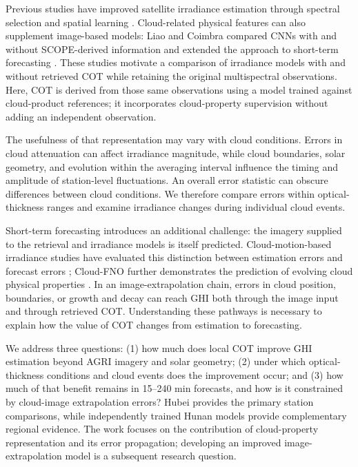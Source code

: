 \documentclass[11pt]{article}
\begin{document}
Previous studies have improved satellite irradiance estimation through spectral selection and spatial learning \cite{chen2023}. Cloud-related physical features can also supplement image-based models: Liao and Coimbra compared CNNs with and without SCOPE-derived information and extended the approach to short-term forecasting \cite{liao2024}. These studies motivate a comparison of irradiance models with and without retrieved COT while retaining the original multispectral observations. Here, COT is derived from those same observations using a model trained against cloud-product references; it incorporates cloud-property supervision without adding an independent observation.

The usefulness of that representation may vary with cloud conditions. Errors in cloud attenuation can affect irradiance magnitude, while cloud boundaries, solar geometry, and evolution within the averaging interval influence the timing and amplitude of station-level fluctuations. An overall error statistic can obscure differences between cloud conditions. We therefore compare errors within optical-thickness ranges and examine irradiance changes during individual cloud events.

Short-term forecasting introduces an additional challenge: the imagery supplied to the retrieval and irradiance models is itself predicted. Cloud-motion-based irradiance studies have evaluated this distinction between estimation errors and forecast errors \cite{pap2024}; Cloud-FNO further demonstrates the prediction of evolving cloud physical properties \cite{zhang2026}. In an image-extrapolation chain, errors in cloud position, boundaries, or growth and decay can reach GHI both through the image input and through retrieved COT. Understanding these pathways is necessary to explain how the value of COT changes from estimation to forecasting.

We address three questions: (1) how much does local COT improve GHI estimation beyond AGRI imagery and solar geometry; (2) under which optical-thickness conditions and cloud events does the improvement occur; and (3) how much of that benefit remains in 15--240 min forecasts, and how is it constrained by cloud-image extrapolation errors? Hubei provides the primary station comparisons, while independently trained Hunan models provide complementary regional evidence. The work focuses on the contribution of cloud-property representation and its error propagation; developing an improved image-extrapolation model is a subsequent research question.
\end{document}
